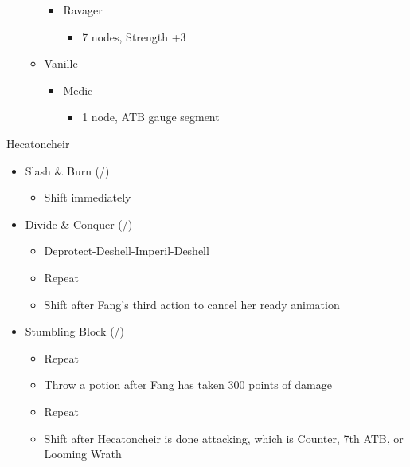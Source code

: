 \begin{paracol}{2}
\begin{menu}
\begin{itemize}
\begin{itemize}
\begin{itemize}
\begin{itemize}
					            \end{itemize}
					      \item Ravager
					            \begin{itemize}
						            \item 7 nodes, Strength +3
					            \end{itemize}
				      \end{itemize}
				\item Vanille
				      \begin{itemize}
					      \item Medic
					            \begin{itemize}
						            \item 1 node, ATB gauge segment
					            \end{itemize}
				      \end{itemize}
			\end{itemize}
		\end{itemize}
	\end{menu}

	\renewcommand{\first}{[1] Slash \& Burn (\rav/\com)}
	\renewcommand{\second}{[2] Lifeguard (\med/\sen)}
	\renewcommand{\third}{[3] Divide \& Conquer (\sab/\com)}
	\renewcommand{\fourth}{[4] Stumbling Block (\sab/\sen)}
	\switchcolumn*
	\begin{battle}{Hecatoncheir}

		\begin{itemize}
			\item \first
			      \begin{itemize}
				      \item Shift immediately
			      \end{itemize}
			\item \third
			      \begin{itemize}
				      \item Deprotect-Deshell-Imperil-Deshell
				      \item Repeat
				      \item Shift after Fang's third action to cancel her ready animation
			      \end{itemize}
			\item \fourth
			      \begin{itemize}
				      \item Repeat
				      \item Throw a potion after Fang has taken 300 points of damage
				      \item Repeat
				      \item Shift after Hecatoncheir is done attacking, which is Counter, 7th ATB, or Looming Wrath
			      \end{itemize}


\end{itemize}
\end{battle}
\end{paracol}
